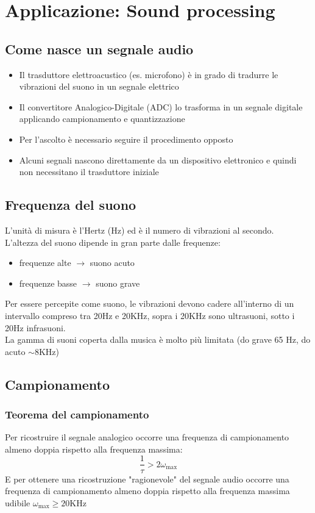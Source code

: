 \documentclass[12pt, a4paper]{report}
\begin{document}
\chapter{Applicazione: Sound processing}
\section{Come nasce un segnale audio}
\begin{itemize}
    \item Il trasduttore elettroacustico (es. microfono) è in grado di tradurre le vibrazioni del suono in  un segnale elettrico
    \item Il convertitore Analogico-Digitale (ADC) lo trasforma in un segnale digitale applicando campionamento e quantizzazione
    \item Per l'ascolto è necessario seguire il procedimento opposto
    \item Alcuni segnali nascono direttamente da un dispositivo elettronico e quindi non necessitano il trasduttore iniziale
\end{itemize}
\section{Frequenza del suono}
L'unità di misura è l'Hertz (Hz) ed è il numero di vibrazioni al secondo.\\
L'altezza del suono dipende in gran parte dalle frequenze:
\begin{itemize}
    \item frequenze alte $\rightarrow$ suono acuto
    \item frequenze basse $\rightarrow$ suono grave
\end{itemize}
Per essere percepite come suono, le vibrazioni devono cadere all'interno di un intervallo compreso tra 20Hz e 20KHz, sopra i 20KHz sono ultrasuoni, sotto i 20Hz infrasuoni.\\
La gamma di suoni coperta dalla musica è molto più limitata (do grave 65 Hz, do acuto $\sim$8KHz)
\section{Campionamento}
\subsection{Teorema del campionamento}
Per ricostruire il segnale analogico occorre una frequenza di campionamento almeno doppia rispetto alla frequenza massima:
\begin{equation*}
    \frac{1}{\tau} > 2\omega_{\text{max}}
\end{equation*}
E per ottenere una ricostruzione "ragionevole" del segnale audio occorre una frequenza di campionamento almeno doppia rispetto alla frequenza massima udibile $\omega_{\text{max}}\geq 20\text{KHz}$
\end{document}
